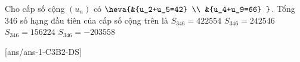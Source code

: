 \begin{ex}%
	Cho cấp số cộng $\left(u_n \right)$ có $\heva{&{u_2+u_5=42} \\
		&{u_4+u_9=66}
	}$. Tổng $346$ số hạng đầu tiên của cấp số cộng trên là
	\choice
	{$S_{346}=422554$}
	{\True $S_{346}=242546$}
	{$S_{346}=156224$}
	{$S_{346}=-203558$}
\end{ex}
\cauds
{}[ans/ans-1-C3B2-DS]

